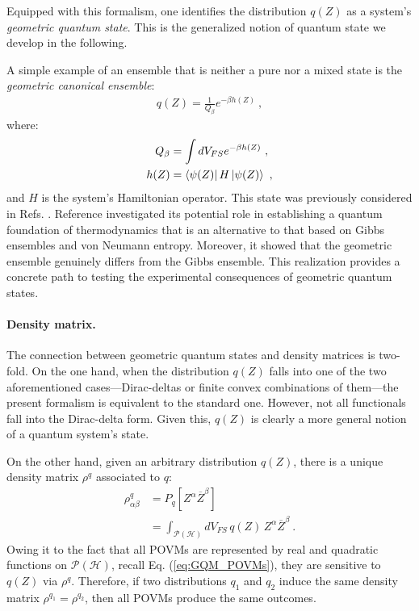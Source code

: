 \documentclass[nofootinbib,pre,twocolumn,showpacs,showkeys,groupaddress,preprintnumbers,floatfix]{revtex4-1}
\newcommand{\1}{\mathbbm{1}}
\newcommand{\intP}{\int_{\mathcal{P}(\mathcal{H})} \!\!\!\!\!\!\!\!\!}
\begin{document}
Equipped with this formalism, one identifies the distribution $q(Z)$ as a
system's \emph{geometric quantum state}. This is the generalized notion of
quantum state we develop in the following.

A simple example of an ensemble that is neither a pure nor a mixed state is
the \emph{geometric canonical ensemble}:
\begin{align*}
q(Z) = \frac{1}{Q_\beta} e^{-\beta h(Z)}
  ~,
\end{align*}
where:
\begin{align*}
  Q_\beta & = \int dV_{FS} e^{-\beta h(Z)} ~, \\
  h(Z) & = \bra{\psi(Z)}H\ket{\psi(Z)} ~,
\end{align*}
and $H$ is the system's Hamiltonian operator. This state was previously
considered in Refs. \cite{Brody1998,Brody2016}. Reference \cite{Anza20b}
investigated its potential role in establishing a quantum foundation of
thermodynamics that is an alternative to that based on Gibbs ensembles and von
Neumann entropy. Moreover, it showed that the geometric ensemble genuinely 
differs from the Gibbs ensemble. This realization provides a concrete path 
to testing the experimental consequences of geometric quantum states.

\paragraph*{Density matrix.}
The connection between geometric quantum states and density matrices is
two-fold. On the one hand, when the distribution $q(Z)$ falls into one of the
two aforementioned cases---Dirac-deltas or finite convex combinations of
them---the present formalism is equivalent to the standard one. However, not
all functionals fall into the Dirac-delta form. Given this, $q(Z)$ is clearly a
more general notion of a quantum system's state.

On the other hand, given an arbitrary distribution $q(Z)$, there is a unique
density matrix $\rho^{q}$ associated to $q$:
\begin{align}
\rho^q_{\alpha \beta} & = P_q[Z^\alpha \overline{Z}^\beta] \nonumber \\
  & = \intP dV_{FS} \, q(Z)  \, Z^\alpha \overline{Z}^\beta
  ~.
\label{eq:densitymatrix}
\end{align}
Owing it to the fact that all POVMs are represented by real and quadratic
functions on $\mathcal{P}(\mathcal{H})$, recall Eq. (\ref{eq:GQM_POVMs}), they
are sensitive to $q(Z)$ via $\rho^q$. Therefore, if two
distributions $q_1$ and $q_2$ induce the same density matrix $\rho^{q_1} =
\rho^{q_2}$, then all POVMs produce the same outcomes.
\end{document}
